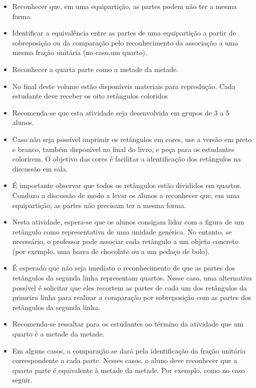 \begin{atividade}\label{chap1-ativ4}
\objetivos
  \begin{itemize} %
    \item       Reconhecer que, em uma equipartição, as partes podem não ter a mesma forma.
    \item       Identificar a equivalência entre as partes de uma equipartição a partir de sobreposição ou da comparação pelo reconhecimento da associação a uma mesma fração unitária (no caso,um quarto).
    \item       Reconhecer a quarta parte como a metade da metade.
\end{itemize}

\discussoes
\begin{itemize} %
\item No final deste volume estão disponíveis materiais para reprodução. Cada estudante deve receber os oito retângulos coloridos
\item Recomenda-se que esta atividade seja desenvolvida em grupos de 3 a 5 alunos.
\item Caso não seja possível imprimir os retângulos em cores, use a versão em preto e branco, também disponível no final do livro, e peça para os estudantes colorirem. O objetivo das cores é facilitar a identificação dos retângulos na discussão em sala.
\item É importante observar que todos os retângulos estão divididos em quartos. Conduza a discussão de modo a levar os alunos a reconhecer que, em uma equipartição, as partes não precisam ter a mesma forma.
\item Nesta atividade, espera-se que os alunos consigam lidar com a figura de um retângulo como representativa de uma unidade genérica.  No entanto, se necessário, o professor pode associar cada retângulo a um objeto concreto (por exemplo, uma barra de chocolate ou a um pedaço de bolo).
\item É esperado que não seja imediato o reconhecimento de que as partes dos retângulos da segunda linha representam quartos. Nesse caso,  uma alternativa possível é solicitar que eles recortem as partes de cada um dos retângulos da primeira linha para realizar a comparação por sobreposição com as partes dos retângulos da segunda linha.
\item Recomenda-se ressaltar para os estudantes ao término da atividade que um quarto é a metade da metade.
\item Em alguns casos, a comparação se dará pela identificação da fração unitária correspondente a cada parte. Nesses casos, o aluno deve reconhecer que a quarta parte é equivalente à metade da metade. Por exemplo, como no caso seguir.


\end{itemize}
\end{atividade}
